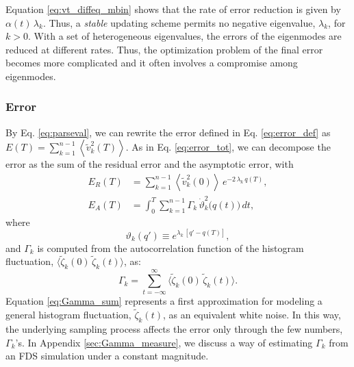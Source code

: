 \documentclass[preprint, superscriptaddress, floatfix]{revtex4-1}
\newcommand{\Err}{E}
\begin{document}
Equation \eqref{eq:vt_diffeq_mbin}
shows that the rate of error reduction
is given by $\alpha(t) \, \lambda_k$.
%
Thus, a \emph{stable} updating scheme
permits no negative eigenvalue, $\lambda_k$,
for $k > 0$.
%
With a set of heterogeneous eigenvalues,
the errors of the eigenmodes are reduced at different rates.
%
Thus, the optimization problem of the final error
becomes more complicated and it often
involves a compromise among eigenmodes.



\subsubsection{Error}



By Eq. \eqref{eq:parseval},
we can rewrite the error defined in Eq. \eqref{eq:error_def} as
$\Err(T) = \sum_{k = 1}^{n - 1} \left\langle {\tilde v}_k^2(T) \right\rangle$.
%
%
As in Eq. \eqref{eq:error_tot},
we can decompose the error as the sum
of the residual error and the asymptotic error, with
\begin{align}
  \Err_R(T)
  &=
  \sum_{k = 1}^{n-1}
    \left\langle
      {\tilde v}_k^2(0)
    \right\rangle \,
    e^{ - 2 \, \lambda_k  \, q(T) }
  ,
  \label{eq:error_res}
  \\
  \Err_A(T)
  &=
  \int_0^T
  \sum_{k = 1}^{n-1}
  \Gamma_k \, \dot \vartheta_k^2\bigl( q(t) \bigr) \, dt
  ,
  \label{eq:error_asym}
\end{align}
%
where
%
\begin{equation}
  \vartheta_k(q') \equiv e^{\lambda_k \, [q' - q(T)]}
  ,
  \label{eq:uk_def}
\end{equation}
%
and $\Gamma_k$ is computed from
the autocorrelation function
of the histogram fluctuation,
$\bigl\langle {\tilde \zeta}_k(0)
\, {\tilde \zeta}_k(t) \bigr\rangle$,
as:
%
\begin{equation}
  \Gamma_k
  = \sum_{t = -\infty}^\infty
  \bigl\langle {\tilde \zeta}_k(0)
            \, {\tilde \zeta}_k(t) \bigr\rangle
  .
  \label{eq:Gamma_sum}
\end{equation}
%
%
Equation \eqref{eq:Gamma_sum} represents
a first approximation for modeling
a general histogram fluctuation, ${\tilde \zeta}_k(t)$,
as an equivalent white noise.
In this way,
the underlying sampling process
affects the error only through the
few numbers, $\Gamma_k$'s.
%
In Appendix \ref{sec:Gamma_measure},
we discuss a way of estimating $\Gamma_k$
from an FDS simulation under a constant magnitude.
%
\end{document}
